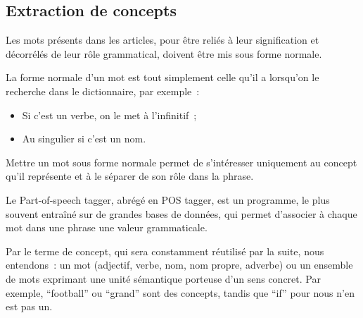 \documentclass[a4paper, 12pt]{article}
\begin{document}
\subsection{Extraction de concepts}

Les mots présents dans les articles, pour être reliés à leur signification et décorrélés de leur rôle grammatical, doivent être mis sous forme normale.

\begin{definition}
La forme normale d'un mot est tout simplement celle qu'il a lorsqu'on le recherche dans le dictionnaire, par exemple~:
\begin{itemize}
 \item Si c'est un verbe, on le met à l'infinitif~;
 \item Au singulier si c'est un nom.
\end{itemize}
Mettre un mot sous forme normale permet de s'intéresser uniquement au concept qu'il représente et à le séparer de son rôle dans la phrase.
\end{definition}


\begin{definition}
Le Part-of-speech tagger, abrégé en POS tagger, est un programme, le plus souvent entraîné sur de grandes bases de données, qui permet d'associer à chaque mot dans une phrase une valeur grammaticale.
\end{definition}

\begin{definition}[Concept]
Par le terme de concept, qui sera constamment réutilisé par la suite, nous entendons~: un mot (adjectif, verbe, nom, nom propre, adverbe) ou un ensemble de mots exprimant une unité sémantique porteuse d'un sens concret. Par exemple, ``football'' ou ``grand'' sont des concepts, tandis que ``if'' pour nous n'en est pas un.
\end{definition}
\end{document}
